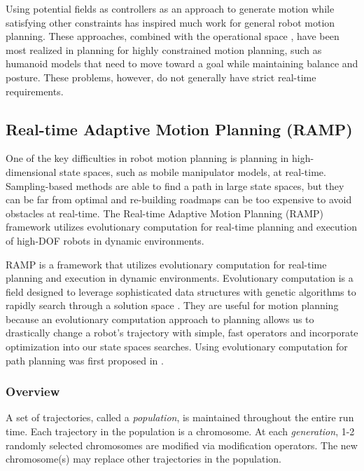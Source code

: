 \documentclass[10pt,conference]{ieeeconf}
\begin{document}
Using potential fields as controllers as an approach to generate motion while satisfying other constraints has inspired much work for general robot motion planning. These approaches, combined with the operational space \cite{khatib1987unified}, have been most realized in planning for highly constrained motion planning, such as humanoid models that need to move toward a goal while maintaining balance and posture. These problems, however, do not generally have strict real-time requirements.

\subsection{Real-time Adaptive Motion Planning (RAMP)}
	
		
One of the key difficulties in robot motion planning is planning in high-dimensional state spaces, such as mobile manipulator models, at real-time. Sampling-based methods are able to find a path in large state spaces, but they can be far from optimal and re-building roadmaps can be too expensive to avoid obstacles at real-time. The Real-time Adaptive Motion Planning (RAMP) \cite{RAMP} framework utilizes evolutionary computation for real-time planning and execution of high-DOF robots in dynamic environments.


RAMP is a framework that utilizes evolutionary computation for real-time planning and execution in dynamic environments. Evolutionary computation is a field designed to leverage sophisticated data structures with genetic algorithms to rapidly search through a solution space \cite{michalewicz2013genetic}. They are useful for motion planning because an evolutionary computation approach to planning allows us to drastically change a robot's trajectory with simple, fast operators and incorporate optimization into our state spaces searches. Using evolutionary computation for path planning was first proposed in \cite{EPN_Adaptive}. 

\subsubsection{Overview}\label{subseq:RAMP Overview}

A set of trajectories, called a \emph{population}, is maintained throughout the entire run time. Each trajectory in the population is a chromosome. At each \emph{generation}, 1-2 randomly selected chromosomes are modified via modification operators. The new chromosome(s) may replace other trajectories in the population. 
\end{document}

